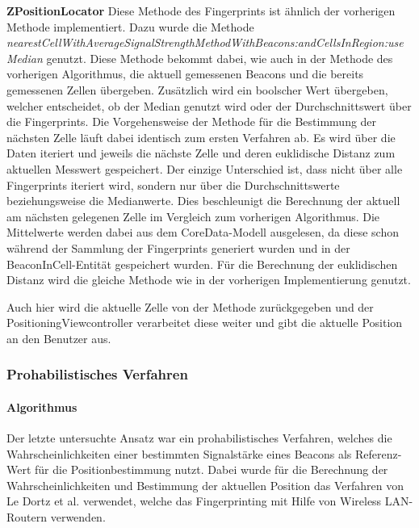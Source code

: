 \textbf{ZPositionLocator}
Diese Methode des Fingerprints ist ähnlich der vorherigen Methode implementiert. Dazu wurde die Methode \emph{nearestCellWithAverageSignalStrengthMethodWithBeacons:andCellsInRegion:useMedian} genutzt. Diese Methode bekommt dabei, wie auch in der Methode des vorherigen Algorithmus, die aktuell gemessenen Beacons und die bereits gemessenen Zellen übergeben. Zusätzlich wird ein boolscher Wert übergeben, welcher entscheidet, ob der Median genutzt wird oder der Durchschnittswert über die Fingerprints.
Die Vorgehensweise der Methode für die Bestimmung der nächsten Zelle läuft dabei identisch zum ersten Verfahren ab. Es wird über die Daten iteriert und jeweils die nächste Zelle und deren euklidische Distanz zum aktuellen Messwert gespeichert. Der einzige Unterschied ist, dass nicht über alle Fingerprints iteriert wird, sondern nur über die Durchschnittswerte beziehungsweise die Medianwerte. Dies beschleunigt die Berechnung der aktuell am nächsten gelegenen Zelle im Vergleich zum vorherigen Algorithmus. 
Die Mittelwerte werden dabei aus dem CoreData-Modell ausgelesen, da diese schon während der Sammlung der Fingerprints generiert wurden und in der BeaconInCell-Entität gespeichert wurden. 
Für die Berechnung der euklidischen Distanz wird die gleiche Methode wie in der vorherigen Implementierung genutzt.

Auch hier wird die aktuelle Zelle von der Methode zurückgegeben und der PositioningViewcontroller verarbeitet diese weiter und gibt die aktuelle Position an den Benutzer aus.

\subsubsection{Prohabilistisches Verfahren}
\label{sec:implementation:fingerprinting:positioning:probability}

\paragraph{Algorithmus}
\label{sec:implementation:fingerprinting:positioning:probability:algorithm}

Der letzte untersuchte Ansatz war ein prohabilistisches Verfahren, welches die Wahrscheinlichkeiten einer bestimmten Signalstärke eines Beacons als Referenz-Wert für die Positionbestimmung nutzt. Dabei wurde für die Berechnung der Wahrscheinlichkeiten und Bestimmung der aktuellen Position das Verfahren von Le Dortz et al. \cite{wifiFingerprintProbability} verwendet, welche das Fingerprinting mit Hilfe von Wireless LAN-Routern verwenden.

